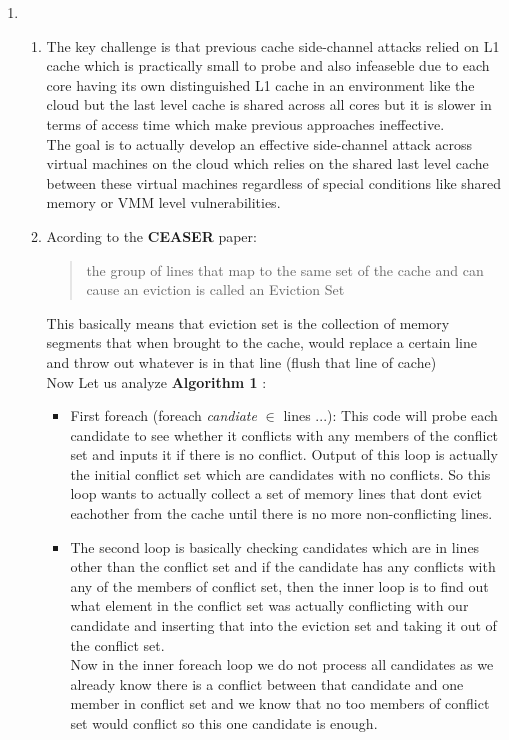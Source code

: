 
\begin{enumerate}
    \item 
    \begin{enumerate}
        
  
    \item The key challenge is that previous cache side-channel attacks relied on 
    L1 cache which is practically small to probe and also infeaseble due to each core having its own 
    distinguished L1 cache in an environment like the cloud but the last level cache is 
    shared across all cores but it is slower in terms of access time which make previous approaches ineffective.\\
    The goal is to actually develop an effective side-channel attack across virtual machines on the cloud which relies on the shared last level cache between 
    these virtual machines regardless of special conditions like shared memory or VMM level vulnerabilities.

    \item Acording to the \textbf{CEASER} paper: \begin{quote}
        the group of lines that
map to the same set of the cache and can cause an eviction is
called an Eviction Set
    \end{quote}
    This basically means that eviction set is the collection of memory segments that when brought to the cache, would 
    replace a certain line and throw out whatever is in that line (flush that line of cache)
    \\ 
    Now Let us analyze \textbf{Algorithm 1} : 
    \begin{itemize}
        \item First foreach (foreach \textit{candiate} $\in$ lines ...): 
        This code will probe each candidate to see whether it conflicts with any members of the conflict set and inputs it if there is no conflict. Output of this 
        loop is actually the initial conflict set which are candidates with no conflicts. So this loop wants to actually collect a set of memory lines that dont evict eachother 
        from the cache until there is no more non-conflicting lines.
        
        \item The second loop is basically 
        checking candidates which are in lines other than 
        the conflict set and if the candidate has any conflicts with any of the members of 
        conflict set, then the inner loop is to find out what element in
        the conflict set was actually conflicting with our candidate and inserting that into the eviction set and taking it out of the conflict set.
        \\
        Now in the inner foreach loop we do not process all candidates as we already know there is 
        a conflict between that candidate and one member in conflict set and we know that no too members of conflict set would conflict so this one candidate is enough.


\end{itemize}
\end{enumerate}
\end{enumerate}
